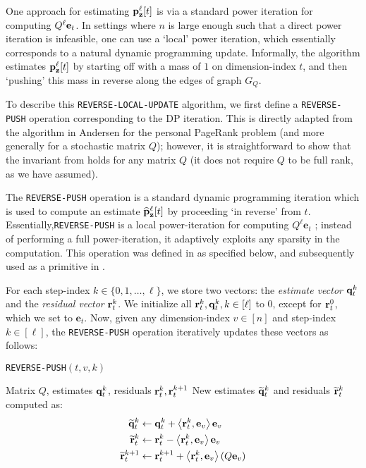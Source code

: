 One approach for estimating ${\mathbf{p}}_\mathbf{z}^{\ell}[t]$ is via a standard power iteration for computing $Q^{\ell}\mathbf{e}_t$. 
In settings where $n$ is large enough such that a direct power iteration is infeasible, one can use a `local' power iteration, which essentially corresponds to a natural dynamic programming update. Informally, the algorithm estimates ${\mathbf{p}}_\mathbf{z}^{\ell}[t]$ by starting off with a mass of $1$ on dimension-index $t$, and then `pushing' this mass in reverse along the edges of graph $G_Q$. 

To describe this \texttt{REVERSE-LOCAL-UPDATE} algorithm, we first define a \texttt{REVERSE-PUSH} operation corresponding to the DP iteration. 
This is directly adapted from the algorithm in Andersen \cite{andersen2007local} for the personal PageRank problem (and more generally for a stochastic matrix $Q$); however, it is straightforward to show that the invariant from \cite{andersen2007local} holds for any matrix $Q$ (it does not require $Q$ to be full rank, as we have assumed).
 
The \texttt{REVERSE-PUSH} operation is a standard dynamic programming iteration which is used to compute an estimate $\widehat{\mathbf{p}}_\mathbf{z}^{\ell}[t]$ by proceeding `in reverse' from $t$. 
Essentially,\texttt{REVERSE-PUSH} is a local power-iteration for computing $Q^{\ell}\mathbf{e}_t$ ; instead of performing a full power-iteration, it adaptively exploits any sparsity in the computation.
This operation was defined in \cite{andersen2007local} as specified below, and subsequently used as a primitive in \cite{banerjee2015fast, lee2014asynchronous}.


For each step-index $k \in\{0,1,\ldots,\ell \}$, we store two vectors: the \emph{estimate vector} $\mathbf{q}^{k}_t$ and the \emph{residual vector} $\mathbf{r}^{k}_t$.
We initialize all $\mathbf{r}^{k}_t,\mathbf{q}^{k}_t, k\in[\ell]$ to $0$, except for $\mathbf{r}^{0}_t$, which we set to $\mathbf{e}_t$.
Now, given any dimension-index $v\in[n]$ and step-index $k \in[\ell]$, the \texttt{REVERSE-PUSH} operation iteratively updates these vectors as follows:
\begin{algorithm}[!ht]
\caption{\texttt{REVERSE-PUSH}$(t,v,k)$}
\label{alg:push}
\begin{algorithmic}[1]
\REQUIRE Matrix $Q$, estimates $\mathbf{q}^{k}_t$, residuals $\mathbf{r}^{k}_t,\mathbf{r}^{k+1}_t$
\RETURN New estimates $\widetilde{\mathbf{q}}^{k}_t$ and residuals $\widetilde{\mathbf{r}}^{k}_t$ computed as:
\begin{align*}
	\widetilde{\mathbf{q}}^{k}_t &\leftarrow \mathbf{q}^{k}_t + \left< \mathbf{r}^{k}_t, \mathbf{e}_v \right>\mathbf{e}_v \\
	\widetilde{\mathbf{r}}^{k}_t &\leftarrow \mathbf{r}^{k}_t - \left< \mathbf{r}^{k}_t, \mathbf{e}_v \right>\mathbf{e}_v \\
	\widetilde{\mathbf{r}}^{k+1}_t &\leftarrow \mathbf{r}^{k+1}_t + \left< \mathbf{r}^{k}_t, \mathbf{e}_v \right>(Q\mathbf{e}_v)
\end{align*}	
\end{algorithmic}
\end{algorithm}    

